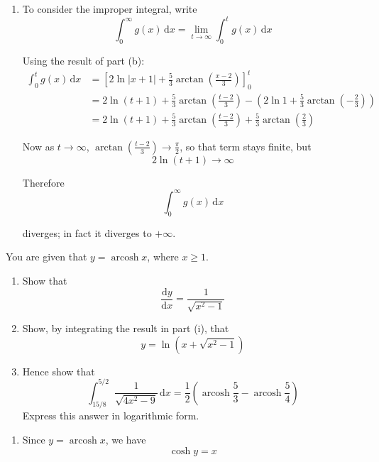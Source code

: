 \documentclass[leqno]{article}
\begin{document}
\begin{enumerate}[
  label=\textbf{\arabic*.},
  leftmargin=*,
  topsep=0pt,
  partopsep=0pt,
  parsep=0pt
]
\begin{djsSolution}
\begin{enumerate}[label=\textbf{(\alph*)}]
So
\[
A=2,\qquad B=\frac{5}{3}
\]

  \item To consider the improper integral, write
\[
\int_0^\infty g(x)\,\mathrm{d}x=\lim_{t\to\infty}\int_0^t g(x)\,\mathrm{d}x
\]

Using the result of part (b):
\begin{align*}
\int_0^t g(x)\,\mathrm{d}x
&=\left[2\ln|x+1|+\frac{5}{3}\arctan\left(\frac{x-2}{3}\right)\right]_0^t \\
&=2\ln(t+1)+\frac{5}{3}\arctan\left(\frac{t-2}{3}\right)
-\left(2\ln 1+\frac{5}{3}\arctan\left(-\frac23\right)\right) \\
&=2\ln(t+1)+\frac{5}{3}\arctan\left(\frac{t-2}{3}\right)+\frac{5}{3}\arctan\left(\frac23\right)
\end{align*}

Now as $t\to\infty$, $\arctan\left(\frac{t-2}{3}\right)\to \frac{\pi}{2}$, so that term stays finite, but
\[
2\ln(t+1)\to\infty
\]

Therefore
\[
\int_0^\infty g(x)\,\mathrm{d}x
\]

diverges; in fact it diverges to $+\infty$.
\end{enumerate}
\end{djsSolution}


\newpage

\questionitem

You are given that $y=\operatorname{arcosh}x$, where $x\ge 1$. \\

\begin{enumerate}[label=(\roman*), start=1]
  \item Show that
  \[
  \frac{\mathrm{d}y}{\mathrm{d}x}=\frac{1}{\sqrt{x^2-1}}
  \]
  \item Show, by integrating the result in part (i), that
  \[
  y=\ln\left(x+\sqrt{x^2-1}\right)
  \]
  \item Hence show that
  \[
  \int_{15/8}^{5/2} \frac{1}{\sqrt{4x^2-9}}\,\mathrm{d}x=\frac{1}{2}\left(\operatorname{arcosh}\frac{5}{3}-\operatorname{arcosh}\frac{5}{4}\right)
  \]
  Express this answer in logarithmic form.  \\
\end{enumerate}

\vspace*{10pt}

\begin{djsSolution}
\begin{enumerate}[label=\textbf{(\roman*)}]
\item Since \(y=\operatorname{arcosh}x\), we have
\[
\cosh y=x
\]


\end{enumerate}
\end{djsSolution}
\end{enumerate}
\end{document}
